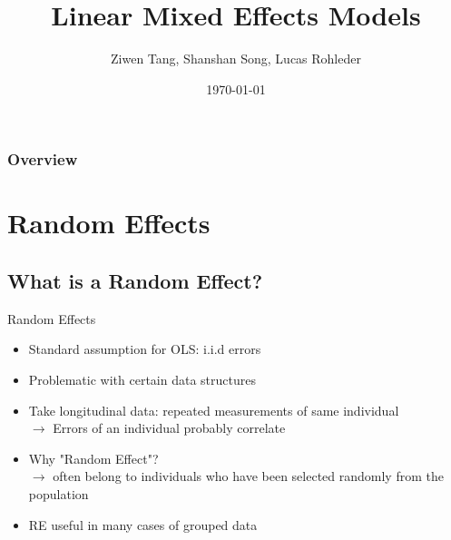 \documentclass{beamer}
\title[LMM Models]{Linear Mixed Effects Models} %
\author{Ziwen Tang, Shanshan Song, Lucas Rohleder} %
\institute[Uni Bonn] %
{
Universität Bonn \\ %
\medskip
}
\date{\today} %
\begin{document}
\begin{frame}
\titlepage %
\end{frame}

\begin{frame}
\frametitle{Overview} %
\tableofcontents %
\end{frame}

\section{Random Effects}
    \subsection{What is a Random Effect?}

\begin{frame}{Random Effects}
\begin{itemize}
    \item Standard assumption for OLS: i.i.d errors
    \item Problematic with certain data structures
    \item Take longitudinal data: repeated measurements of same individual
    \\ $\rightarrow$ Errors of an individual probably correlate
    \item Why "Random Effect"?
    \\ $\rightarrow$ often belong to individuals who have been selected randomly from the
    population
    \item RE useful in many cases of grouped data
 \end{itemize}   
    \end{frame}
\end{document}
